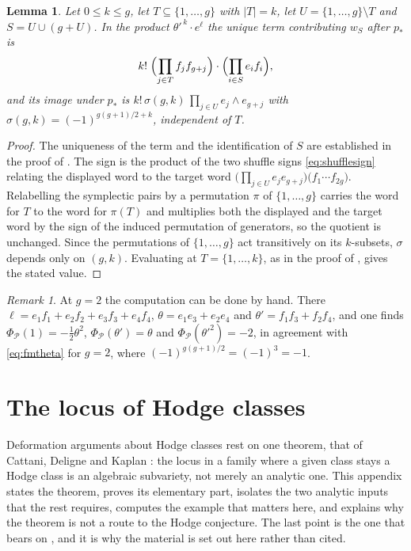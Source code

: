 \documentclass[11pt,reqno]{amsart}
\theoremstyle{plain}
\newtheorem{lemma}[theorem]{Lemma}
\theoremstyle{definition}
\theoremstyle{remark}
\newtheorem{remark}[theorem]{Remark}
\newcommand{\cP}{\mathcal{P}}
\begin{document}
\begin{lemma}\label{lem:appsign}
Let $0\le k\le g$, let $T\subseteq\{1,\dots,g\}$ with $|T|=k$, let
$U=\{1,\dots,g\}\setminus T$ and $S=U\cup(g+U)$. In the product
$\theta'^{\,k}\cdot e^{\ell}$ the unique term contributing $w_{S}$ after
$p_{*}$ is
\[
  k!\;\Bigl(\prod_{j\in T}f_{j}f_{g+j}\Bigr)\cdot\Bigl(\prod_{i\in S}e_{i}f_{i}\Bigr),
\]
and its image under $p_{*}$ is
$k!\,\sigma(g,k)\,\prod_{j\in U}e_{j}\wedge e_{g+j}$ with
$\sigma(g,k)=(-1)^{g(g+1)/2+k}$, independent of $T$.
\end{lemma}

\begin{proof}
The uniqueness of the term and the identification of $S$ are established in
the proof of . The sign is the product of the two shuffle
signs \eqref{eq:shufflesign} relating the displayed word to the target word
$\bigl(\prod_{j\in U}e_{j}e_{g+j}\bigr)\bigl(f_{1}\cdots f_{2g}\bigr)$.
Relabelling the symplectic pairs by a permutation $\pi$ of $\{1,\dots,g\}$
carries the word for $T$ to the word for $\pi(T)$ and multiplies both the
displayed and the target word by the sign of the induced permutation of
generators, so the quotient is unchanged. Since the permutations of
$\{1,\dots,g\}$ act transitively on its $k$-subsets, $\sigma$ depends only on
$(g,k)$. Evaluating at $T=\{1,\dots,k\}$, as in the proof of
, gives the stated value.
\end{proof}

\begin{remark}
At $g=2$ the computation can be done by hand. There
$\ell=e_{1}f_{1}+e_{2}f_{2}+e_{3}f_{3}+e_{4}f_{4}$,
$\theta=e_{1}e_{3}+e_{2}e_{4}$ and $\theta'=f_{1}f_{3}+f_{2}f_{4}$, and one
finds $\Phi_{\cP}(1)=-\tfrac12\theta^{2}$, $\Phi_{\cP}(\theta')=\theta$ and
$\Phi_{\cP}(\theta'^{2})=-2$, in agreement with \eqref{eq:fmtheta} for $g=2$,
where $(-1)^{g(g+1)/2}=(-1)^{3}=-1$.
\end{remark}
\section{The locus of Hodge classes}\label{app:cdk}

Deformation arguments about Hodge classes rest on one theorem, that of
Cattani, Deligne and Kaplan \cite{CDK95}: the locus in a family where a given
class stays a Hodge class is an algebraic subvariety, not merely an analytic
one. This appendix states the theorem, proves its elementary part, isolates
the two analytic inputs that the rest requires, computes the example that
matters here, and explains why the theorem is not a route to the Hodge
conjecture. The last point is the one that bears on ,
and it is why the material is set out here rather than cited.
\end{document}
